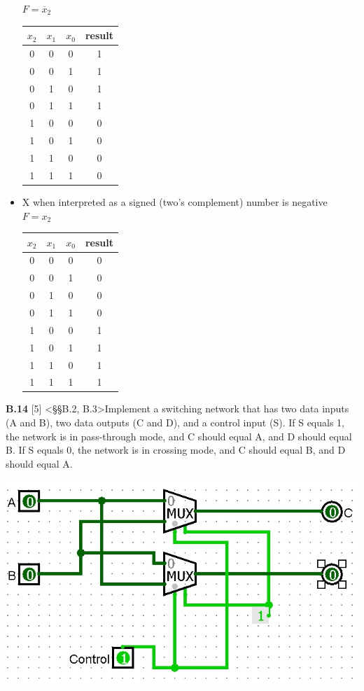 \documentclass{article}
\begin{document}
\begin{itemize}
		$F=\overline{x}_2$
	\\ \begin{tabular}{|c|c|c|c|}
	\hline
	$x_2$ & $x_1$ & $x_0$ & result \\ \hline
	0 & 0 & 0 & 1 \\ \hline
	0 & 0 & 1 & 1 \\ \hline
	0 & 1 & 0 & 1 \\ \hline
	0 & 1 & 1 & 1 \\ \hline
	1 & 0 & 0 & 0 \\ \hline
	1 & 0 & 1 & 0 \\ \hline
	1 & 1 & 0 & 0 \\ \hline
	1 & 1 & 1 & 0 \\ \hline
	\end{tabular} 
	\pagebreak
	\item X when interpreted as a signed (two’s complement) number is 
negative\\
		$F=x_2$
	\\ \begin{tabular}{|c|c|c|c|}
	\hline
	$x_2$ & $x_1$ & $x_0$ & result \\ \hline
	0 & 0 & 0 & 0 \\ \hline
	0 & 0 & 1 & 0 \\ \hline
	0 & 1 & 0 & 0 \\ \hline
	0 & 1 & 1 & 0 \\ \hline
	1 & 0 & 0 & 1 \\ \hline
	1 & 0 & 1 & 1 \\ \hline
	1 & 1 & 0 & 1 \\ \hline
	1 & 1 & 1 & 1 \\ \hline
	\end{tabular} 
\end{itemize}
\noindent \textbf{B.14} [5] <§§B.2, B.3>Implement a switching network that has two data inputs (A and B), two data outputs (C and D), and a control input (S). If S equals 1, the network is in pass-through mode, and C should equal A, and D should equal B. If S equals 0, the network is in crossing mode, and C should equal B, and D should
equal A. 

\includegraphics{logsim}
\end{document}
